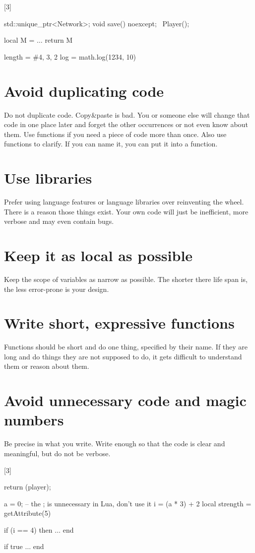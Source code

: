 \documentclass[a4paper,11pt]{scrreprt}
\newcommand{\marginMarker}[1]{%
\marginnote{%
    \hfill%
		\Huge{#1}%
}[3\baselineskip]%
}
\newcommand{\conforming}{%
\marginMarker{\textcolor{green}{\ding{51}}}%
}
\newcommand{\nonconforming}{%
\marginMarker{\textcolor{red}{\ding{55}}}%
}
\begin{document}
\conforming{}
\begin{cppBox}
std::unique_ptr<Network>;
void save() noexcept;
~Player();
\end{cppBox}
\begin{luaBox}[mathescape]
local M = {}
$\dots$
return M

length = #{4, 3, 2}
log = math.log(1234, 10)
\end{luaBox}

\section{Avoid duplicating code}
Do not duplicate code. Copy\&paste is bad. You or someone else will change that code in one place later and forget the other occurrences or not even know about them. Use functions if you need a piece of code more than once. Also use functions to clarify. If you can name it, you can put it into a function.

\section{Use libraries}
Prefer using language features or language libraries over reinventing the wheel. There is a reason those things exist. Your own code will just be inefficient, more verbose and may even contain bugs.

\section{Keep it as local as possible}
Keep the scope of variables as narrow as possible. The shorter there life span is, the less error-prone is your design.

\section{Write short, expressive functions}
Functions should be short and do one thing, specified by their name. If they are long and do things they are not supposed to do, it gets difficult to understand them or reason about them.

\section{Avoid unnecessary code and magic numbers}
Be precise in what you write. Write enough so that the code is clear and meaningful, but do not be verbose.

\nonconforming{}
\begin{cppBox}
return (player);
\end{cppBox}
\begin{luaBox}[mathescape]
a = 0; -- the ; is unnecessary in Lua, don't use it
i = (a * 3) + 2
local strength = getAttribute(5)

if (i == 4) then
    $\dots$
end

if true
    $\dots$
end
\end{luaBox}
\end{document}
